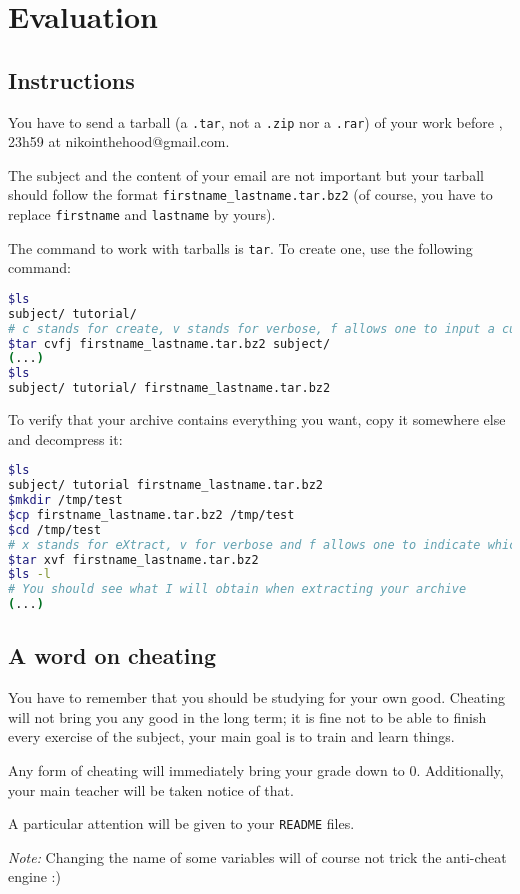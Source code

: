 \documentclass[12pt]{article}
\begin{document}
\section{Evaluation}
\subsection{Instructions}

You have to send a tarball (a \texttt{.tar}, not a \texttt{.zip} nor a \texttt{.rar}) of your work before , 23h59 at nikointhehood@gmail.com.

The subject and the content of your email are not important but your tarball should follow the format \texttt{firstname\_lastname.tar.bz2} (of course, you have to replace \texttt{firstname} and \texttt{lastname} by yours).

The command to work with tarballs is \texttt{tar}. To create one, use the following command:

\begin{lstlisting}[language=bash]
$ls
subject/ tutorial/
# c stands for create, v stands for verbose, f allows one to input a custom name for the archive and j indicates the usage of bzip2
$tar cvfj firstname_lastname.tar.bz2 subject/
(...)
$ls
subject/ tutorial/ firstname_lastname.tar.bz2
\end{lstlisting}

To verify that your archive contains everything you want, copy it somewhere else and decompress it:

\begin{lstlisting}[language=bash]
$ls
subject/ tutorial firstname_lastname.tar.bz2
$mkdir /tmp/test
$cp firstname_lastname.tar.bz2 /tmp/test
$cd /tmp/test
# x stands for eXtract, v for verbose and f allows one to indicate which file tar should work with
$tar xvf firstname_lastname.tar.bz2
$ls -l
# You should see what I will obtain when extracting your archive
(...)
\end{lstlisting}
\subsection{A word on cheating}

You have to remember that you should be studying for your own good. Cheating will not bring you any good in the long term; it is fine not to be able to finish every exercise of the subject, your main goal is to train and learn things.

Any form of cheating will immediately bring your grade down to 0. Additionally, your main teacher will be taken notice of that.

A particular attention will be given to your \texttt{README} files.

\textit{Note:} Changing the name of some variables will of course not trick the anti-cheat engine :)
\end{document}
